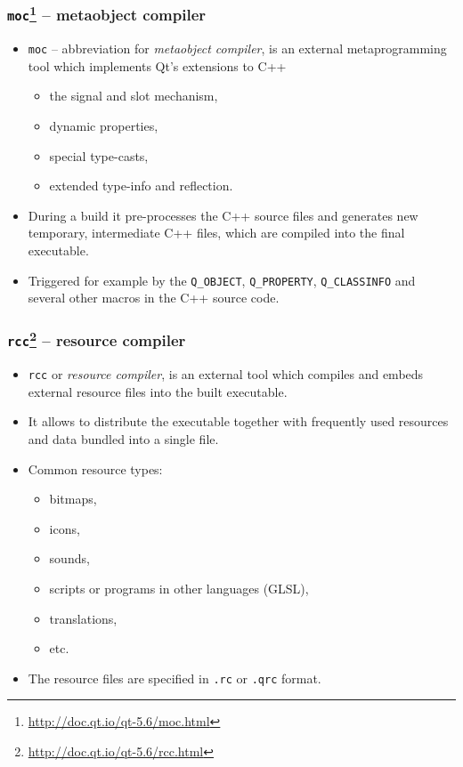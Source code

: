 \begin{frame}
  \frametitle{\texttt{moc}\footnote
    {\url{http://doc.qt.io/qt-5.6/moc.html}} -- metaobject compiler}
  \begin{itemize}
    \item \texttt{moc} -- abbreviation for {\em metaobject compiler},
      is an external metaprogramming tool which implements Qt's extensions to
      C++
      \begin{itemize}
        \item the signal and slot mechanism,
        \item dynamic properties,
        \item special type-casts,
        \item extended type-info and reflection.
      \end{itemize}
    \item During a build it pre-processes the C++ source files and generates
      new temporary, intermediate C++ files, which are compiled into the final
      executable.
    \item Triggered for example by the \texttt{Q\_OBJECT}, \texttt{Q\_PROPERTY},
      \texttt{Q\_CLASSINFO} and several other macros in the C++ source code.
  \end{itemize}
\end{frame}

\begin{frame}
  \frametitle{\texttt{rcc}\footnote
    {\url{http://doc.qt.io/qt-5.6/rcc.html}} -- resource compiler}
  \begin{itemize}
    \item \texttt{rcc} or {\em resource compiler}, is an external tool which
      compiles and embeds external resource files into the built executable.
    \item It allows to distribute the executable together with frequently
      used resources and data bundled into a single file.
    \item Common resource types:
      \begin{itemize}
        \item bitmaps,
        \item icons,
        \item sounds,
        \item scripts or programs in other languages (GLSL),
        \item translations,
        \item etc.
      \end{itemize}
    \item The resource files are specified in \texttt{.rc} or \texttt{.qrc} format.
  \end{itemize}
\end{frame}

